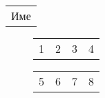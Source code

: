 \documentclass{article}
\begin{document}
\begin{tabular}{|c|}
Име
\end{tabular}


\begin{figure}
\parbox{1.5cm}
{
\begin{tabular}{| l | c | c | c |}
1 & 2 & 3 & 4
\end{tabular}
}
\qquad
\begin{minipage}{1.5cm}
\begin{tabular}{l | c | c | c |}
5 & 6 & 7 & 8
\end{tabular}
\end{minipage}
\end{figure}
\end{document}
